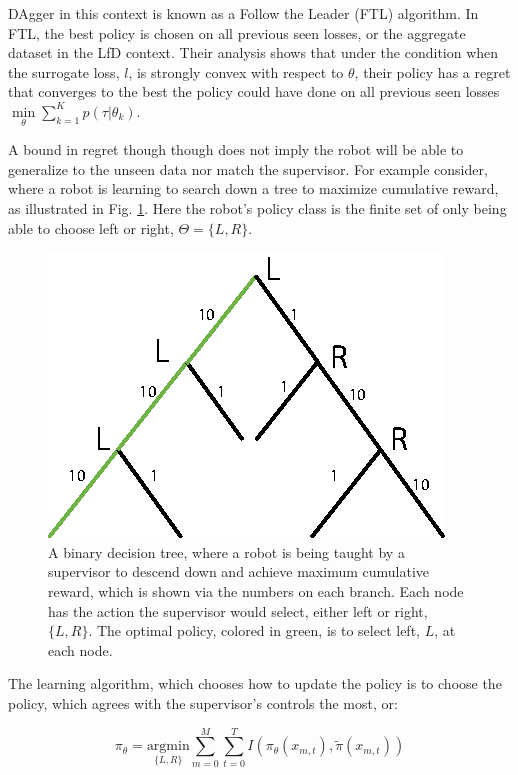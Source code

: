 \documentclass[10pt, conference]{ieeeconf}      %
\begin{document}
DAgger in this context is known as a Follow the Leader (FTL) algorithm. In FTL, the best policy is chosen on all previous seen losses, or the aggregate dataset in the LfD context. Their analysis shows that under the condition when the surrogate loss, $l$, is strongly convex with respect to $\theta$, their policy has a regret that converges to the best the policy could have done on all previous seen losses $\underset{\theta}{\min} \sum_{k=1}^K p(\tau|\theta_k)$. 

A bound in regret though though does not imply the robot will be able to generalize to the unseen data nor match the supervisor. For example consider, where a robot is learning to search down a tree to maximize cumulative reward, as illustrated in Fig. \ref{fig:c_ex}. Here the robot's policy class is the finite set of only being able to choose left or right, $\Theta = \lbrace L,R \rbrace$.

\begin{figure}
\centering
\includegraphics{f_figs/counter_exmp.eps}
\caption{
    \footnotesize
A binary decision tree, where a robot is being taught by a supervisor to descend down and achieve maximum cumulative reward, which is shown via the numbers on each branch. Each node has the action the supervisor would select, either left or right, $\lbrace L, R \rbrace$. The optimal policy, colored in green, is to select left, $L$, at each node.}
\vspace*{-20pt}
\label{fig:c_ex}
\end{figure}

The learning algorithm, which chooses how to update the policy is to choose the policy, which agrees with the supervisor's controls the most, or: 

$$\pi_{\theta} = \underset{\lbrace L,R \rbrace}{\mbox{argmin}} \sum^M_{m=0}\sum^T_{t=0} I(\pi_\theta(x_{m,t}),\tilde{\pi}(x_{m,t}))$$
\end{document}
